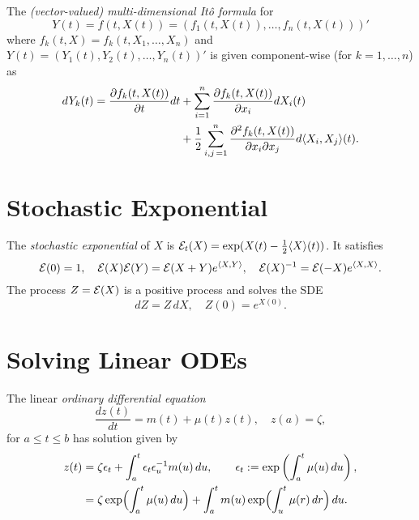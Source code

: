 \documentclass[twocolumn]{amsart}
\begin{document}
The \emph{(vector-valued) multi-dimensional It\^{o} formula} for
\begin{equation*}
    Y(t) = f(t,X(t)) = (f_1(t,X(t)), \ldots, f_n(t,X(t)))'
\end{equation*}
where $f_k(t, X) = f_k(t, X_1, \ldots, X_n)$ and $Y(t) = (Y_1(t), Y_2(t), \ldots, Y_n(t))'$ is given component-wise (for $k=1, \ldots, n$) as
\begin{align*}
    d Y_k(t) = \frac{\partial f_k(t,X(t))}{\partial t} dt
            &+ \sum_{i=1}^n \frac{\partial f_k(t,X(t))}{\partial x_i} dX_i(t) \\
            &+ \frac{1}{2}\sum_{i,j\,=1}^n \frac{\partial^2 f_k(t,X(t))}{\partial x_i \partial x_j} d \langle X_i, X_j\rangle(t).
\end{align*}

\section*{Stochastic Exponential}
The \emph{stochastic exponential} of $X$ is $\mathcal{E}_t(X) = \exp({X(t) - \frac12 \langle X\rangle(t)})$. It satisfies
\begin{equation*}
    \mathcal{E}(0) = 1, \quad \mathcal{E}(X)\mathcal{E}(Y) = \mathcal{E}(X+Y)e^{\langle X,Y\rangle}, \quad \mathcal{E}(X)^{-1} = \mathcal{E}(-X) e^{\langle X,X\rangle}.
\end{equation*}
The process $Z = \mathcal{E}(X)$ is a positive process and solves the SDE
\begin{equation*}
    dZ = Z\,dX, \quad Z(0) = e^{X(0)}.
\end{equation*}

\section*{Solving Linear ODEs}

The linear \emph{ordinary differential equation}
\begin{equation*}
    \frac{dz(t)}{dt} = m(t) + \mu(t)z(t), \quad z(a) = \zeta,
\end{equation*}
for $a \le t \le b$ has solution given by
\begin{equation*}
    \begin{aligned}
    z(t) &= \zeta \epsilon_t + \int_a^t \epsilon_t \epsilon_u^{-1} m(u)\,du, \qquad\epsilon_t := \exp\left(\int_a^t \mu(u)\,du\right), \\
    & = \zeta \exp\Bigl({\int_a^t \mu(u)\,du}\Bigr) + \int_a^t m(u) \exp\Bigl({\int_u^t \mu(r)\,dr}\Bigr)\,du.
    \end{aligned}
\end{equation*}
\end{document}

